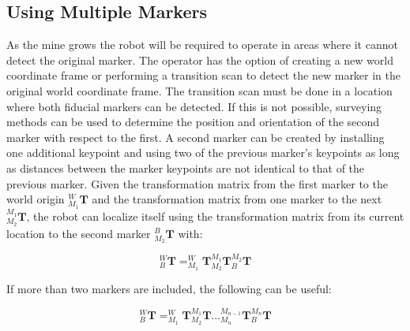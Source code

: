 \subsection{Using Multiple Markers}

As the mine grows the robot will be required to operate in areas where it cannot detect the original marker. The operator has the option of creating a new world coordinate frame or performing a transition scan to detect the new marker in the original world coordinate frame. The transition scan must be done in a location where both fiducial markers can be detected. If this is not possible, surveying methods can be used to determine the position and orientation of the second marker with respect to the first. A second marker can be created by installing one additional keypoint and using two of the previous marker's keypoints as long as distances between the marker keypoints are not identical to that of the previous marker. Given the transformation matrix from the first marker to the world origin $^{W}_{M_1}\mathbf{T}$ and the transformation matrix from one marker to the next $^{M_1}_{M_2}\mathbf{T}$, the robot can localize itself using the transformation matrix from its current location to the second marker $^{B}_{M_2}\mathbf{T}$ with:

\begin{equation}
\label{eq:mtmat}
    ^{W}_{B}\mathbf{T} = ^{W}_{M_1}\mathbf{T}^{M_1}_{M_2}\mathbf{T}^{M_2}_{B}\mathbf{T}
\end{equation}

If more than two markers are included, the following can be useful:

\begin{equation}
\label{eq:mmtmat}
   ^{W}_{B}\mathbf{T} = ^{W}_{M_1}\mathbf{T}^{M_1}_{M_2}\mathbf{T}\hdots^{M_{n-1}}_{M_n}\mathbf{T}^{M_n}_{B}\mathbf{T}
\end{equation}

